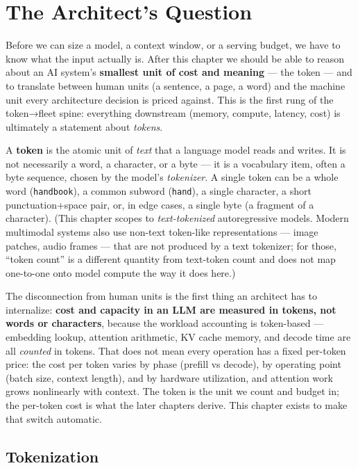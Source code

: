 \section*{The Architect's Question}\label{the-architects-question}

Before we can size a model, a context window, or a serving budget, we
have to know what the input actually is. After this chapter we should be
able to reason about an AI system's \textbf{smallest unit of cost and
meaning} --- the token --- and to translate between human units (a
sentence, a page, a word) and the machine unit every architecture
decision is priced against. This is the first rung of the token→fleet
spine: everything downstream (memory, compute, latency, cost) is
ultimately a statement about \emph{tokens}.

\label{concept}


A \textbf{token} is the atomic unit of \emph{text} that a language model
reads and writes. It is not necessarily a word, a character, or a byte
--- it is a vocabulary item, often a byte sequence, chosen by the
model's \emph{tokenizer}. A single token can be a whole word
(\texttt{handbook}), a common subword (\texttt{hand}), a single
character, a short punctuation+space pair, or, in edge cases, a single
byte (a fragment of a character). (This chapter scopes to
\emph{text-tokenized} autoregressive models. Modern multimodal systems
also use non-text token-like representations --- image patches, audio
frames --- that are not produced by a text tokenizer; for those, ``token
count'' is a different quantity from text-token count and does not map
one-to-one onto model compute the way it does here.)

The disconnection from human units is the first thing an architect has
to internalize: \textbf{cost and capacity in an LLM are measured in
tokens, not words or characters}, because the workload accounting is
token-based --- embedding lookup, attention arithmetic, KV cache memory,
and decode time are all \emph{counted} in tokens. That does not mean
every operation has a fixed per-token price: the cost per token varies
by phase (prefill vs decode), by operating point (batch size, context
length), and by hardware utilization, and attention work grows
nonlinearly with context. The token is the unit we count and budget in;
the per-token cost is what the later chapters derive. This chapter
exists to make that switch automatic.

\subsection{Tokenization}\label{tokenization}

